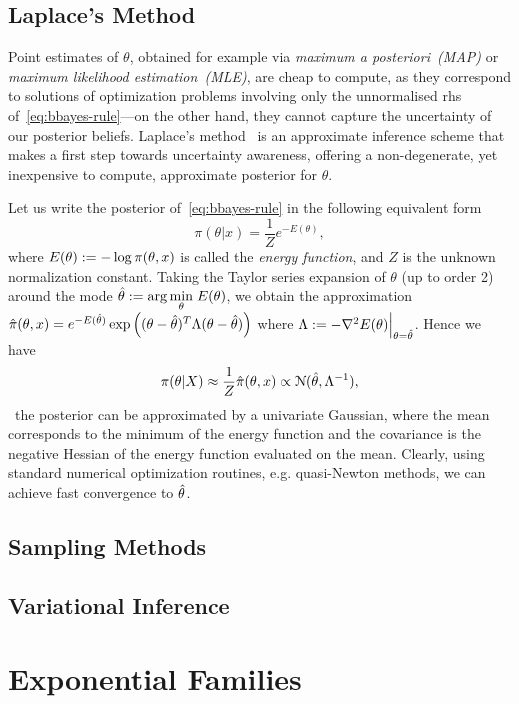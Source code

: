 \subsection{Laplace's Method}
\label{subsec:b-laplace-method}

Point estimates of $\theta$, obtained for example via \emph{maximum a posteriori~(MAP)} or \emph{maximum likelihood estimation~(MLE)}, are cheap to compute, as they correspond to solutions of optimization problems involving only the unnormalised rhs of~\cref{eq:bbayes-rule}---on the other hand, they cannot capture the uncertainty of our posterior beliefs. Laplace's method~\citep{mackay03} is an approximate inference scheme that makes a first step towards uncertainty awareness, offering a non-degenerate, yet inexpensive to compute, approximate posterior for $\theta$.

Let us write the posterior of~\cref{eq:bbayes-rule} in the following equivalent form
\[
\pi(\theta|x) = \frac{1}{Z} e^{-E(\theta)},
\]
where $E(\theta) := - \log \pi(\theta, x)$ is called the \emph{energy function}, and $ Z $ is the unknown normalization constant. Taking the Taylor series expansion of $\theta$ (up to order 2) around the mode $ {\hat{\theta} := \arg \underset{\theta}{\min} \;E(\theta)}$, we obtain the approximation 
$ \hat{\pi}(\theta, x) = e^{-E(\hat{\theta})}\exp\left((\theta - \hat{\theta})^T\Lambda (\theta - \hat{\theta})\right)$ where  $ \Lambda := -\nabla^2 E(\theta)\Big|_{\theta = \hat{\theta}}$.
Hence we have
\[
\pi(\theta|X) \approx \frac{1}{Z}   \hat{\pi}(\theta, x)  \propto \mathcal{N}(\hat{\theta}, \Lambda^{-1}), 
\label{eq:blaplace-approx}
\]  
\ie~the posterior can be approximated by a univariate Gaussian, where the mean corresponds to the minimum of the energy function and the covariance is the negative Hessian of the energy function evaluated on the mean. Clearly, using standard numerical optimization routines, e.g. quasi-Newton methods, we can achieve fast convergence to $\hat{\theta}$. 

\subsection{Sampling Methods}
\label{subsec:b-sampling-methods}

\subsection{Variational Inference}
\label{subsec:b-variational-inference}

\section{Exponential Families}
\label{sec:b-expfam}

